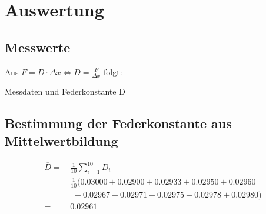 \newpage
\section{Auswertung}
\label{sec:Auswertung}
\subsection{Messwerte}
Aus $F = D \cdot \Delta x \Leftrightarrow D = \frac{F}{\Delta x}$ folgt:
\begin{table}[H]
  \centering
  
  \caption{\label{tab:Messdaten}Messdaten und Federkonstante D}
\end{table}

\subsection{Bestimmung der Federkonstante aus Mittelwertbildung}
\begin{equation}
\begin{aligned}
  \overline{D} {} = & \,\frac{1}{10} \sum_{i=1}^{10} D_i \\
        =& \,\frac{1}{10} (0.03000 + 0.02900 + 0.02933 + 0.02950 + 0.02960\\
        & \:\;+ 0.02967 + 0.02971 + 0.02975 + 0.02978 + 0.02980)\\
        =& \,0.02961
\end{aligned}
\end{equation}

